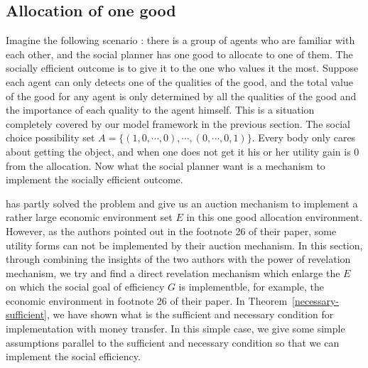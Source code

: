 \subsection{Allocation of one good  }

Imagine the following scenario : there is a group of agents who are familiar with each other, and the social planner has
one good to allocate to one of them. The socially efficient outcome is to give it to the one who 
values it the most. Suppose each agent can only detects one of the qualities of the good, and the total value of the 
good for any agent is only determined by all the qualities of the good and the importance of each quality to the agent 
himself. This is a situation completely covered by our model framework in the previous section. The social choice possibility
set $A=\{(1,0,\cdots,0),\cdots,(0,\cdots,0,1)\}$. Every body only cares about getting the object, and when one does not get it his or
her utility gain is 0 from the allocation. Now what the social planner want is a mechanism to implement the socially efficient outcome. 

\parencite{Maskin00} has partly solved the problem and give us an auction mechanism to implement a rather large economic 
environment set $E$ in this one good allocation environment. However, as the authors pointed out in the footnote 26 of 
their paper, some utility forms can not be implemented by their auction mechanism. In this section, through combining the 
insights of the two authors with the power of revelation mechanism, we try and find a direct revelation mechanism  which
enlarge the $E$ on which the social goal of efficiency $G$ is implementble, for example, the economic environment in footnote
26 of their paper.
In Theorem~\ref{necessary-sufficient}, we have shown what is the sufficient and necessary condition for implementation with money 
transfer. In this simple case, we give some simple assumptions parallel to the sufficient and necessary condition
so that we can implement the social efficiency.

